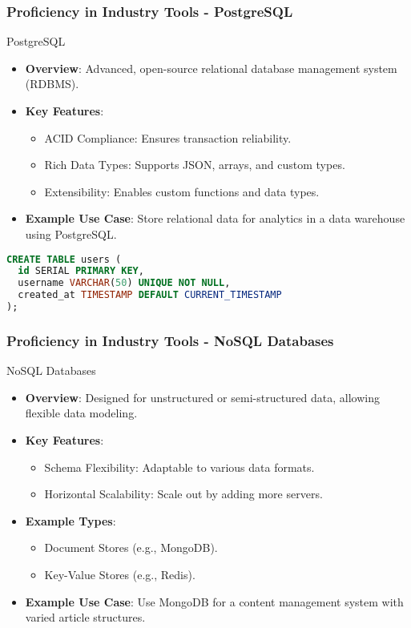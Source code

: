 \documentclass[aspectratio=169]{beamer}
\begin{document}
\begin{frame}[fragile]
    \frametitle{Proficiency in Industry Tools - PostgreSQL}
    \begin{block}{PostgreSQL}
        \begin{itemize}
            \item \textbf{Overview}: Advanced, open-source relational database management system (RDBMS).
            \item \textbf{Key Features}:
            \begin{itemize}
                \item ACID Compliance: Ensures transaction reliability.
                \item Rich Data Types: Supports JSON, arrays, and custom types.
                \item Extensibility: Enables custom functions and data types.
            \end{itemize}
            \item \textbf{Example Use Case}: Store relational data for analytics in a data warehouse using PostgreSQL.
        \end{itemize}
    \end{block}
    \begin{lstlisting}[language=sql, caption=Example of creating a table in PostgreSQL]
CREATE TABLE users (
  id SERIAL PRIMARY KEY,
  username VARCHAR(50) UNIQUE NOT NULL,
  created_at TIMESTAMP DEFAULT CURRENT_TIMESTAMP
);
    \end{lstlisting}
\end{frame}

\begin{frame}
    \frametitle{Proficiency in Industry Tools - NoSQL Databases}
    \begin{block}{NoSQL Databases}
        \begin{itemize}
            \item \textbf{Overview}: Designed for unstructured or semi-structured data, allowing flexible data modeling.
            \item \textbf{Key Features}:
            \begin{itemize}
                \item Schema Flexibility: Adaptable to various data formats.
                \item Horizontal Scalability: Scale out by adding more servers.
            \end{itemize}
            \item \textbf{Example Types}:
            \begin{itemize}
                \item Document Stores (e.g., MongoDB).
                \item Key-Value Stores (e.g., Redis).
            \end{itemize}
            \item \textbf{Example Use Case}: Use MongoDB for a content management system with varied article structures.
        \end{itemize}
    \end{block}
\end{frame}
\end{document}
